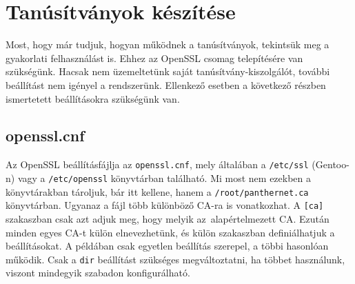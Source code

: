 \section{Tanúsítványok készítése}
Most, hogy már tudjuk, hogyan működnek a tanúsítványok, tekintsük meg a gyakorlati felhasználást is. Ehhez az OpenSSL
csomag telepítésére van szükségünk. Hacsak nem üzemeltetünk saját tanúsítvány-kiszolgálót, további beállítást nem
igényel a rendszerünk. Ellenkező esetben a következő részben ismertetett beállításokra szükségünk van.

\subsection{openssl.cnf}
Az OpenSSL beállításfájlja az \texttt{openssl.cnf}, mely általában a \texttt{/etc/ssl} (Gentoo-n) vagy a
\texttt{/etc/openssl} könyvtárban található. Mi most nem
ezekben a könyvtárakban tároljuk, bár itt kellene, hanem a \texttt{/root/panthernet.ca} könyvtárban. Ugyanaz a fájl több
különböző CA-ra is vonatkozhat. A \texttt{[ca]} szakaszban csak azt adjuk meg, hogy melyik az~alapértelmezett CA. Ezután
minden egyes CA-t külön elnevezhetünk, és külön szakaszban definiálhatjuk a beállításokat. A példában csak egyetlen
beállítás szerepel, a többi hasonlóan működik. Csak a \texttt{dir} beállítást szükséges megváltoztatni, ha többet
használunk, viszont mindegyik szabadon konfigurálható.

